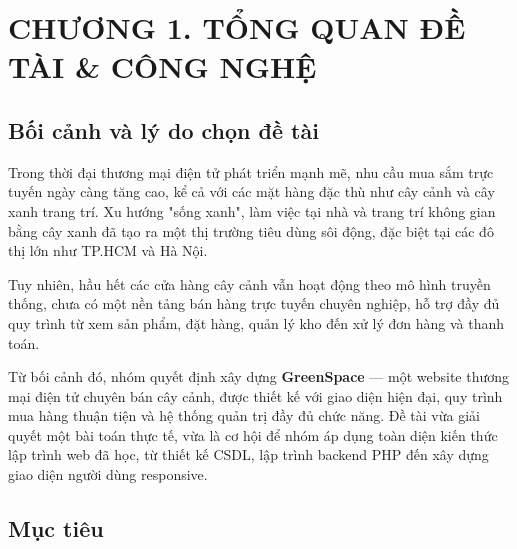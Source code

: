 \documentclass[a4paper]{article}
\begin{document}
\renewcommand{\contentsname}{MỤC LỤC}
\tableofcontents

\clearpage

\setcounter{page}{1}

\section{CHƯƠNG 1. TỔNG QUAN ĐỀ TÀI \& CÔNG NGHỆ}

\subsection{Bối cảnh và lý do chọn đề tài}

Trong thời đại thương mại điện tử phát triển mạnh mẽ, nhu cầu mua sắm trực tuyến ngày càng tăng cao, kể cả với các mặt hàng đặc thù như cây cảnh và cây xanh trang trí. Xu hướng "sống xanh", làm việc tại nhà và trang trí không gian bằng cây xanh đã tạo ra một thị trường tiêu dùng sôi động, đặc biệt tại các đô thị lớn như TP.HCM và Hà Nội.

Tuy nhiên, hầu hết các cửa hàng cây cảnh vẫn hoạt động theo mô hình truyền thống, chưa có một nền tảng bán hàng trực tuyến chuyên nghiệp, hỗ trợ đầy đủ quy trình từ xem sản phẩm, đặt hàng, quản lý kho đến xử lý đơn hàng và thanh toán.

Từ bối cảnh đó, nhóm quyết định xây dựng \textbf{GreenSpace} --- một website thương mại điện tử chuyên bán cây cảnh, được thiết kế với giao diện hiện đại, quy trình mua hàng thuận tiện và hệ thống quản trị đầy đủ chức năng. Đề tài vừa giải quyết một bài toán thực tế, vừa là cơ hội để nhóm áp dụng toàn diện kiến thức lập trình web đã học, từ thiết kế CSDL, lập trình backend PHP đến xây dựng giao diện người dùng responsive.

\subsection{Mục tiêu}
\end{document}
